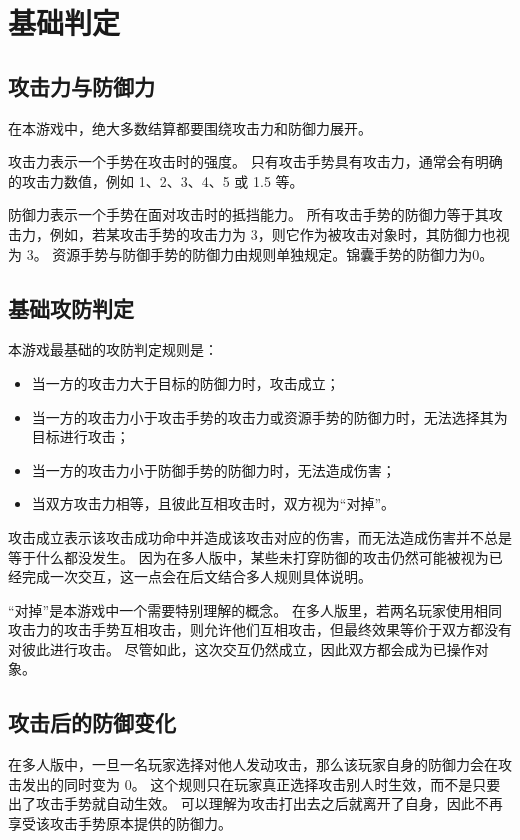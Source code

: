 \documentclass[12pt]{ctexart}
\begin{document}
\section{基础判定}

\subsection{攻击力与防御力}

在本游戏中，绝大多数结算都要围绕攻击力和防御力展开。

攻击力表示一个手势在攻击时的强度。
只有攻击手势具有攻击力，通常会有明确的攻击力数值，例如 1、2、3、4、5 或 1.5 等。

防御力表示一个手势在面对攻击时的抵挡能力。
所有攻击手势的防御力等于其攻击力，例如，若某攻击手势的攻击力为 3，则它作为被攻击对象时，其防御力也视为 3。
资源手势与防御手势的防御力由规则单独规定。锦囊手势的防御力为0。

\subsection{基础攻防判定}

本游戏最基础的攻防判定规则是：

\begin{itemize}
    \item 当一方的攻击力大于目标的防御力时，攻击成立；
    \item 当一方的攻击力小于攻击手势的攻击力或资源手势的防御力时，无法选择其为目标进行攻击；
    \item 当一方的攻击力小于防御手势的防御力时，无法造成伤害；
    \item 当双方攻击力相等，且彼此互相攻击时，双方视为“对掉”。
\end{itemize}

攻击成立表示该攻击成功命中并造成该攻击对应的伤害，而无法造成伤害并不总是等于什么都没发生。
因为在多人版中，某些未打穿防御的攻击仍然可能被视为已经完成一次交互，这一点会在后文结合多人规则具体说明。

“对掉”是本游戏中一个需要特别理解的概念。
在多人版里，若两名玩家使用相同攻击力的攻击手势互相攻击，则允许他们互相攻击，但最终效果等价于双方都没有对彼此进行攻击。
尽管如此，这次交互仍然成立，因此双方都会成为已操作对象。

\subsection{攻击后的防御变化}

在多人版中，一旦一名玩家选择对他人发动攻击，那么该玩家自身的防御力会在攻击发出的同时变为 0。
这个规则只在玩家真正选择攻击别人时生效，而不是只要出了攻击手势就自动生效。
可以理解为攻击打出去之后就离开了自身，因此不再享受该攻击手势原本提供的防御力。
\end{document}
